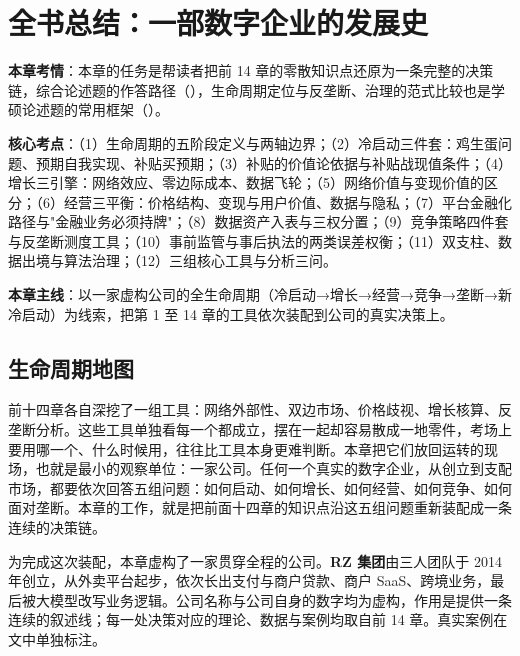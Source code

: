 \chapter{全书总结：一部数字企业的发展史}


\begin{examguide}
\textbf{本章考情}：本章的任务是帮读者把前 14 章的零散知识点还原为一条完整的决策链，综合论述题的作答路径（），生命周期定位与反垄断、治理的范式比较也是学硕论述题的常用框架（）。

\textbf{核心考点}：（1）生命周期的五阶段定义与两轴边界；（2）冷启动三件套：鸡生蛋问题、预期自我实现、补贴买预期；（3）补贴的价值论依据与补贴战现值条件；（4）增长三引擎：网络效应、零边际成本、数据飞轮；（5）网络价值与变现价值的区分；（6）经营三平衡：价格结构、变现与用户价值、数据与隐私；（7）平台金融化路径与"金融业务必须持牌"；（8）数据资产入表与三权分置；（9）竞争策略四件套与反垄断测度工具；（10）事前监管与事后执法的两类误差权衡；（11）双支柱、数据出境与算法治理；（12）三组核心工具与分析三问。

\textbf{本章主线}：以一家虚构公司的全生命周期（冷启动→增长→经营→竞争→垄断→新冷启动）为线索，把第 1 至 14 章的工具依次装配到公司的真实决策上。
\end{examguide}

\section{生命周期地图}

前十四章各自深挖了一组工具：网络外部性、双边市场、价格歧视、增长核算、反垄断分析。这些工具单独看每一个都成立，摆在一起却容易散成一地零件，考场上要用哪一个、什么时候用，往往比工具本身更难判断。本章把它们放回运转的现场，也就是最小的观察单位：一家公司。任何一个真实的数字企业，从创立到支配市场，都要依次回答五组问题：如何启动、如何增长、如何经营、如何竞争、如何面对垄断。本章的工作，就是把前面十四章的知识点沿这五组问题重新装配成一条连续的决策链。

为完成这次装配，本章虚构了一家贯穿全程的公司。\textbf{RZ 集团}由三人团队于 2014 年创立，从外卖平台起步，依次长出支付与商户贷款、商户 SaaS、跨境业务，最后被大模型改写业务逻辑。公司名称与公司自身的数字均为虚构，作用是提供一条连续的叙述线；每一处决策对应的理论、数据与案例均取自前 14 章。真实案例在文中单独标注。

